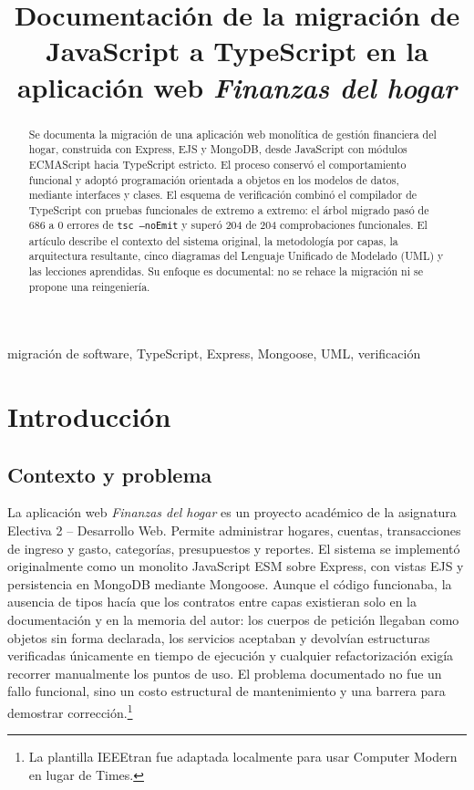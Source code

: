 \documentclass[conference]{IEEEtran}
\begin{document}
\title{Documentación de la migración de JavaScript a TypeScript en la
aplicación web \emph{Finanzas del hogar}}

\author{
}

\maketitle

\begin{abstract}
Se documenta la migración de una aplicación web monolítica de gestión
financiera del hogar, construida con Express, EJS y MongoDB, desde JavaScript con módulos
ECMAScript hacia TypeScript estricto. El proceso conservó el comportamiento
funcional y adoptó programación orientada a objetos en los modelos de datos,
mediante interfaces y clases. El esquema de verificación combinó el compilador
de TypeScript con pruebas funcionales de extremo a extremo: el árbol migrado pasó de 686 a 0 errores de
\texttt{tsc --noEmit} y superó 204 de 204 comprobaciones funcionales. El
artículo describe el contexto del sistema original, la metodología por capas,
la arquitectura resultante, cinco diagramas del Lenguaje Unificado de
Modelado (UML) y las lecciones aprendidas. Su
enfoque es documental: no se rehace la migración ni se propone una
reingeniería.
\end{abstract}

\begin{IEEEkeywords}
migración de software, TypeScript, Express, Mongoose, UML, verificación
\end{IEEEkeywords}

\section{Introducción}

\subsection{Contexto y problema}
La aplicación web \emph{Finanzas del hogar} es un proyecto académico de la
asignatura Electiva 2 -- Desarrollo Web. Permite administrar hogares, cuentas,
transacciones de ingreso y gasto, categorías, presupuestos y reportes. El
sistema se implementó originalmente como un monolito JavaScript ESM sobre
Express, con vistas EJS y persistencia en MongoDB mediante Mongoose. Aunque el
código funcionaba, la ausencia de tipos hacía que los contratos entre capas
existieran solo en la documentación y en la memoria del autor: los cuerpos de
petición llegaban como objetos sin forma declarada, los servicios aceptaban y
devolvían estructuras verificadas únicamente en tiempo de ejecución y
cualquier refactorización exigía recorrer manualmente los puntos de uso. El
problema documentado no fue un fallo funcional, sino un costo estructural de
mantenimiento y una barrera para demostrar corrección.\footnote{La plantilla
IEEEtran fue adaptada localmente para usar Computer Modern en lugar de Times.}
\end{document}
